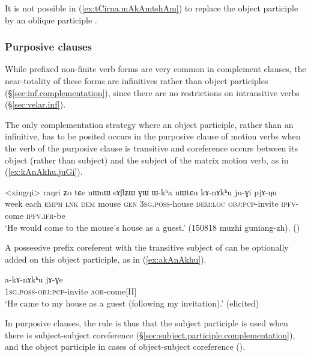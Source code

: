 It is not possible in (\ref{ex:tCirna.mAkAmtshAm}) to replace the object participle by an oblique participle .

\subsubsection{Purposive clauses} \label{sec:object.participles.complement}
While  prefixed non-finite verb forms are very common in complement clauses, the near-totality of these forms are infinitives rather than object participles (§\ref{sec:inf.complementation}), since there are no restrictions on intransitive verbs (§\ref{sec:velar.inf}).

The only complementation strategy where an object participle, rather than an infinitive, has to be posited occurs in the purposive clause of  motion verbs when the verb of the purposive clause is transitive and coreference occurs between its object (rather than subject) and the subject of the matrix motion verb, as  in (\ref{ex:kAnAkhu.juGi}).

\begin{exe}
\ex \label{ex:kAnAkhu.juGi}
\gll <xingqi> raŋri ʑo tɕe nɯnɯ sɤβʑɯ ɣɯ ɯ-kʰa nɯtɕu kɤ-nɤkʰu ju-ɣi pjɤ-ŋu  \\
week each \textsc{emph} \textsc{lnk} \textsc{dem} mouse \textsc{gen} \textsc{3sg}.\textsc{poss}-house \textsc{dem}:\textsc{loc} \textsc{obj}:\textsc{pcp}-invite \textsc{ipfv}-come \textsc{ipfv}.\textsc{ifr}-be \\
\glt `He would come to the mouse's house as a guest.' (150818 muzhi guniang-zh).
()
\end{exe}

 A possessive prefix coreferent with the transitive subject of  can be optionally added on this object participle, as in (\ref{ex:akAnAkhu}).

\begin{exe}
\ex \label{ex:akAnAkhu}
\gll a-kɤ-nɤkʰu jɤ-ɣe  \\
 \textsc{1sg}.\textsc{poss}-\textsc{obj}:\textsc{pcp}-invite \textsc{aor}-come[II] \\
\glt `He came to my house as a guest (following my invitation).' (elicited)
\end{exe}

In purposive clauses, the rule is thus that the subject participle is used when there is subject-subject coreference (§\ref{sec:subject.participle.complementation}), and the object participle in cases of object-subject coreference  (\citealt[248]{jacques16complementation}). 
